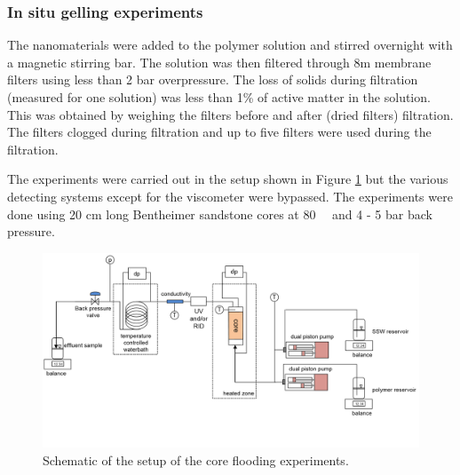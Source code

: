 \documentclass[energies,article,submit,moreauthors,pdftex]{Definitions/mdpi}
\begin{document}
\subsubsection{In situ gelling experiments}

The nanomaterials were added to the polymer solution and stirred overnight with a magnetic stirring bar. The solution was then filtered through 8\micro m membrane filters using less than 2 bar overpressure. The loss of solids during filtration (measured for one solution) was less than 1\% of active matter in the solution. This was obtained by weighing the filters before and after (dried filters) filtration. The filters clogged during filtration and up to five filters were used during the filtration.

The experiments were carried out in the setup shown in Figure \ref{fig:experimentalSetup} but the various detecting systems except for the viscometer were bypassed. The experiments were done using 20 cm long Bentheimer sandstone cores at 80~\celsius~ and 4 - 5 bar back pressure.

\begin{figure}[h!]
        \includegraphics[width=\textwidth]{fig/experimentalSetup.png}
        \caption{Schematic of the setup of the core flooding experiments.}
        \label{fig:experimentalSetup}
\end{figure}
\end{document}
